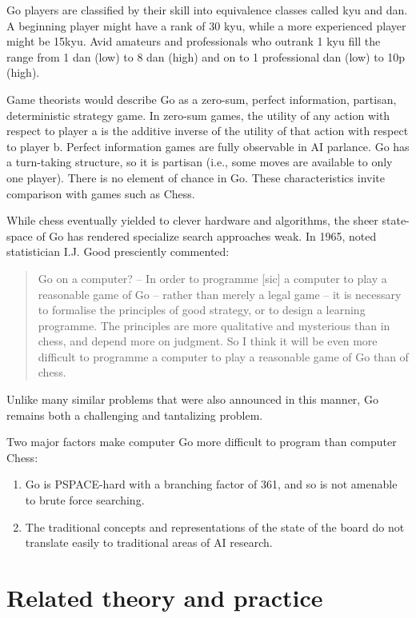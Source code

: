 \documentclass{memoir}
\begin{document}
Go players are classified by their skill into equivalence classes called kyu and dan. A beginning player might have a rank of 30 kyu, while a more experienced player might be 15kyu. Avid amateurs and professionals who outrank 1 kyu fill the range from 1 dan (low) to 8 dan (high) and on to 1 professional dan (low) to 10p (high).

Game theorists would describe Go as a zero-sum, perfect information, partisan, deterministic strategy game. In zero-sum games, the utility of any action with respect to player a is the additive inverse of the utility of that action with respect to player b. Perfect information games are fully observable in AI parlance. Go has a turn-taking structure, so it is partisan (i.e., some moves are available to only one player). There is no element of chance in Go. These characteristics invite comparison with games such as Chess.

While chess eventually yielded to clever hardware and algorithms, the sheer state-space of Go has rendered specialize search approaches weak. In 1965, noted statistician I.J. Good presciently commented:

\begin{quote}
Go on a computer? -- In order to programme [sic] a computer to play a reasonable game of Go -- rather than merely a legal game -- it is necessary to formalise the principles of good strategy, or to design a learning programme. The principles are more qualitative and mysterious than in chess, and depend more on judgment. So I think it will be even more difficult to programme a computer to play a reasonable game of Go than of chess. \cite{Good65}
\end{quote}

Unlike many similar problems that were also announced in this manner, Go remains both a challenging and tantalizing problem.

Two major factors make computer Go more difficult to program than computer Chess:
\begin{enumerate}
  \item Go is PSPACE-hard with a branching factor of 361, and so is not amenable to brute force searching.
  \item The traditional concepts and representations of the state of the board do not translate easily to traditional areas of AI research.
\end{enumerate}

\chapter{Related theory and practice}
\end{document}

